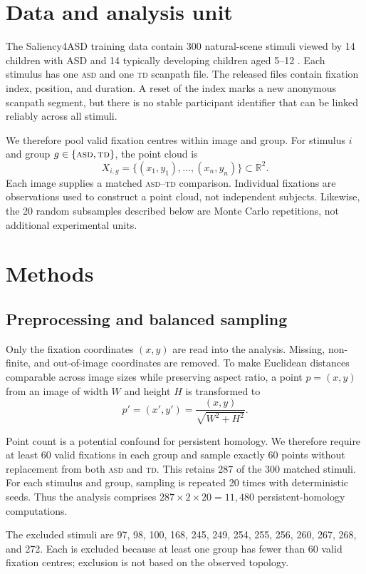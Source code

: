 \documentclass[11pt,a4paper]{article}
\newcommand{\ASD}{\textsc{asd}}
\newcommand{\TD}{\textsc{td}}
\newcommand{\R}{\mathbb{R}}
\begin{document}
\section{Data and analysis unit}

The Saliency4ASD training data contain 300 natural-scene stimuli viewed by 14
children with ASD and 14 typically developing children aged 5--12
\cite{duan2019}.  Each stimulus has one \ASD{} and one \TD{} scanpath file.
The released files contain fixation index, position, and duration.  A reset of
the index marks a new anonymous scanpath segment, but there is no stable
participant identifier that can be linked reliably across all stimuli.

We therefore pool valid fixation centres within image and group.  For stimulus
$i$ and group $g\in\{\ASD,\TD\}$, the point cloud is
\[
X_{i,g}=\{(x_1,y_1),\ldots,(x_n,y_n)\}\subset\R^2.
\]
Each image supplies a matched \ASD--\TD{} comparison.  Individual fixations
are observations used to construct a point cloud, not independent subjects.
Likewise, the 20 random subsamples described below are Monte Carlo
repetitions, not additional experimental units.

\section{Methods}

\subsection{Preprocessing and balanced sampling}

Only the fixation coordinates $(x,y)$ are read into the analysis.  Missing,
non-finite, and out-of-image coordinates are removed.  To make Euclidean
distances comparable across image sizes while preserving aspect ratio, a point
$p=(x,y)$ from an image of width $W$ and height $H$ is transformed to
\[
p'=(x',y')=\frac{(x,y)}{\sqrt{W^2+H^2}}.
\]

Point count is a potential confound for persistent homology.  We therefore
require at least 60 valid fixations in each group and sample exactly 60 points
without replacement from both \ASD{} and \TD{}.  This retains 287 of the 300
matched stimuli.  For each stimulus and group, sampling is repeated 20 times
with deterministic seeds.  Thus the analysis comprises
$287\times2\times20=11{,}480$ persistent-homology computations.

The excluded stimuli are 97, 98, 100, 168, 245, 249, 254, 255, 256, 260, 267,
268, and 272.  Each is excluded because at least one group has fewer than 60
valid fixation centres; exclusion is not based on the observed topology.
\end{document}
